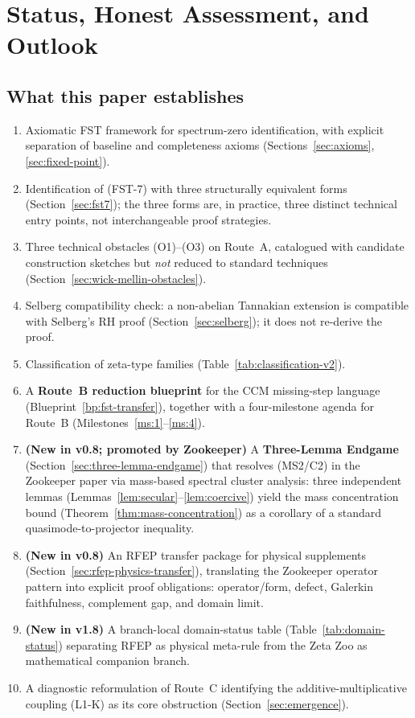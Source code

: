 \documentclass[11pt,a4paper]{article}
\theoremstyle{plain}
\theoremstyle{definition}
\begin{document}
\section{Status, Honest Assessment, and Outlook}
\label{sec:status}

\subsection{What this paper establishes}

\begin{enumerate}[leftmargin=*]
\item Axiomatic FST framework for spectrum-zero identification,
  with explicit separation of baseline and completeness axioms
  (Sections~\ref{sec:axioms}, \ref{sec:fixed-point}).
\item Identification of (FST-7) with three structurally equivalent
  forms (Section~\ref{sec:fst7}); the three forms are, in practice,
  three distinct technical entry points, not interchangeable proof
  strategies.
\item Three technical obstacles (O1)--(O3) on Route~A, catalogued
  with candidate construction sketches but \emph{not} reduced to
  standard techniques (Section~\ref{sec:wick-mellin-obstacles}).
\item Selberg compatibility check: a non-abelian Tannakian extension
  is compatible with Selberg's RH proof
  (Section~\ref{sec:selberg}); it does not re-derive the proof.
\item Classification of zeta-type families
  (Table~\ref{tab:classification-v2}).
\item A \textbf{Route~B reduction blueprint} for the CCM
  missing-step language
  (Blueprint~\ref{bp:fst-transfer}), together with a
  four-milestone agenda for Route~B
  (Milestones~\ref{ms:1}--\ref{ms:4}).
\item \textbf{(New in v0.8; promoted by Zookeeper)} A
  \textbf{Three-Lemma Endgame}
  (Section~\ref{sec:three-lemma-endgame}) that resolves
  (MS2/C2) in the Zookeeper paper via mass-based spectral cluster
  analysis: three independent
  lemmas (Lemmas~\ref{lem:secular}--\ref{lem:coercive}) yield the
  mass concentration bound
  (Theorem~\ref{thm:mass-concentration}) as a corollary of
  a standard quasimode-to-projector inequality.
\item \textbf{(New in v0.8)} An RFEP transfer package for physical
  supplements (Section~\ref{sec:rfep-physics-transfer}), translating
  the Zookeeper operator pattern into explicit proof obligations:
  operator/form, defect, Galerkin faithfulness, complement gap, and
  domain limit.
\item \textbf{(New in v1.8)} A branch-local domain-status table
  (Table~\ref{tab:domain-status}) separating RFEP as physical
  meta-rule from the Zeta Zoo as mathematical companion branch.
\item A diagnostic reformulation of Route~C identifying the
  additive-multiplicative coupling (L1-K) as its core obstruction
  (Section~\ref{sec:emergence}).
\end{enumerate}
\end{document}
